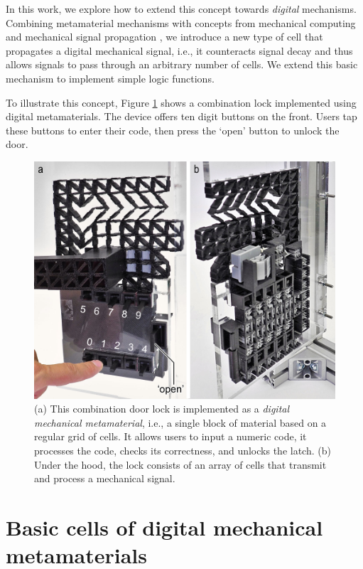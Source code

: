 In this work, we explore how to extend this concept towards \textit{digital} mechanisms. Combining metamaterial mechanisms with concepts from mechanical computing and mechanical signal propagation \cite{Raney2016, Nadkarni2014}, we introduce a new type of cell that propagates a digital mechanical signal, i.e., it counteracts signal decay and thus allows signals to pass through an arbitrary number of cells. We extend this basic mechanism to implement simple logic functions. 

To illustrate this concept, Figure \ref{fig:1-door-lock} shows a combination lock implemented using digital metamaterials. The device offers ten digit buttons on the front. Users tap these buttons to enter their code, then press the `open' button to unlock the door. 

\begin{figure} [h]
    \includegraphics[width=\textwidth]{chapters/digital-metamaterials-FIG/1-door-lock.pdf}
    \caption[Short figure name.]{(a) This combination door lock is implemented as a \textit{digital mechanical metamaterial}, i.e., a single block of material based on a regular grid of cells. It allows users to input a numeric code, it processes the code, checks its correctness, and unlocks the latch. (b) Under the hood, the lock consists of an array of cells that transmit and process a mechanical signal. 
    \label{fig:1-door-lock}}
\end{figure}


\section{Basic cells of digital mechanical metamaterials}

